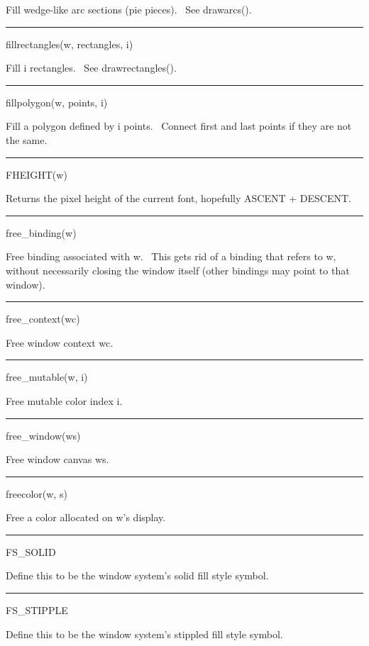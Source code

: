 Fill wedge-like arc sections (pie pieces). \ See \textsf{drawarcs()}.


\bigskip\hrule\vspace{0.1cm}
\noindent
fillrectangles(w, rectangles, i)


Fill i rectangles. \ See \textsf{drawrectangles()}.


\bigskip\hrule\vspace{0.1cm}
\noindent
fillpolygon(w, points, i)


Fill a polygon defined by i points. \ Connect first and last points if they are not the same.


\bigskip\hrule\vspace{0.1cm}
\noindent
FHEIGHT(w)


Returns the pixel height of the current font, hopefully \textsf{ASCENT + DESCENT.}


\bigskip\hrule\vspace{0.1cm}
\noindent
free\_binding(w)


Free binding associated with \textsf{w}. \ This gets rid of a binding that refers to \textsf{w}, without necessarily
closing the window itself (other bindings may point to that window).


\bigskip\hrule\vspace{0.1cm}
\noindent
free\_context(wc)


Free window context \textsf{wc}.


\bigskip\hrule\vspace{0.1cm}
\noindent
free\_mutable(w, i)


Free mutable color index \textsf{i}.


\bigskip\hrule\vspace{0.1cm}
\noindent
free\_window(ws)


Free window canvas \textsf{ws}.


\bigskip\hrule\vspace{0.1cm}
\noindent
freecolor(w, s)


Free a color allocated on \textsf{w}{}'s display.


\bigskip\hrule\vspace{0.1cm}
\noindent
FS\_SOLID


Define this to be the window system's solid fill style symbol.


\bigskip\hrule\vspace{0.1cm}
\noindent
FS\_STIPPLE


Define this to be the window system's stippled fill style symbol.


